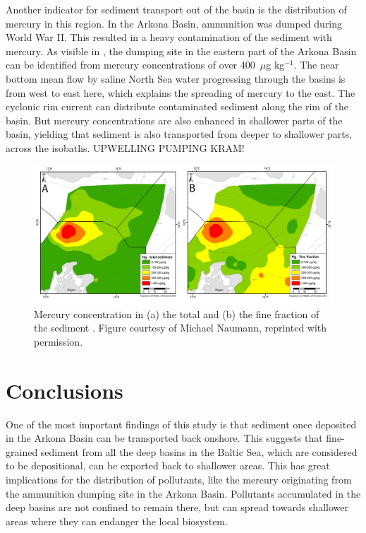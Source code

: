 Another indicator for sediment transport out of the basin is the distribution 
of mercury in this region. In the Arkona Basin, ammunition was dumped during 
World War II. This resulted in a heavy contamination of the sediment with 
mercury. As visible in , the dumping site in the eastern part of the 
Arkona Basin can be identified from mercury concentrations of over 400~$\mu$g 
kg$^{-1}$. The near bottom mean flow by saline North Sea water progressing 
through the basins is from west to east here, which explains the spreading of 
mercury to the east. The cyclonic rim current can distribute contaminated 
sediment along the rim of the basin. But mercury concentrations 
are also enhanced in shallower parts of the basin, yielding that sediment is 
also transported from deeper to shallower parts, across the isobaths. UPWELLING 
PUMPING KRAM!
   \begin{figure}[ht]
\includegraphics[width=17cm]{bilder/hg.pdf}
 \caption{Mercury concentration in (a) the total and (b) the fine 
fraction of the sediment \citep[][]{mercury}. Figure courtesy of Michael 
Naumann, reprinted with permission.}
 \label{hg}
 \end{figure}
 
\section{Conclusions}

One of the most important findings of this study is that sediment once 
deposited in the Arkona Basin can be transported back onshore. 
This suggests that fine-grained sediment from all the deep basins in the Baltic 
Sea, which are considered to be depositional, can be exported back to 
shallower areas. This has great implications for the distribution of 
pollutants, 
like the mercury originating from the ammunition dumping site in the Arkona 
Basin. Pollutants accumulated in the deep basins are not confined to remain 
there, but can spread towards shallower areas where they can endanger the local 
biosystem.


